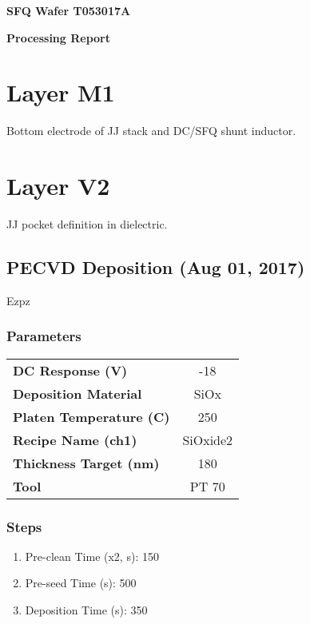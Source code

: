 \documentclass{article}%
\begin{document}
%
\normalsize%
\pagestyle{header}%
%
\begin{minipage}{\textwidth}%
\centering%
\begin{Large}%
\textbf{SFQ Wafer T053017A}%
\end{Large}%
\linebreak%
\begin{large}%
\textbf{Processing Report}%
\end{large}%
\end{minipage}%
\tableofcontents%
\pagebreak%
%
\setcounter{page}{1}%
\section{Layer M1}%
Bottom electrode of JJ stack and DC/SFQ shunt inductor.

%
\section{Layer V2}%
JJ pocket definition in dielectric.%
\subsection{PECVD Deposition (Aug 01, 2017)}%
Ezpz%
\subsubsection{Parameters}%
\begin{tabular}{l|c}%
\hline%
\textbf{DC Response (V)}&{-}18\\%
\textbf{Deposition Material}&SiOx\\%
\textbf{Platen Temperature (C)}&250\\%
\textbf{Recipe Name (ch1)}&SiOxide2\\%
\textbf{Thickness Target (nm)}&180\\%
\textbf{Tool}&PT 70\\%
\end{tabular}

%
\subsubsection{Steps}%
\begin{enumerate}[label=\arabic*),start=1]%
\item%
Pre{-}clean Time (x2, s): 150%
\item%
Pre{-}seed Time (s): 500%
\item%
Deposition Time (s): 350%
\end{enumerate}
\end{document}
